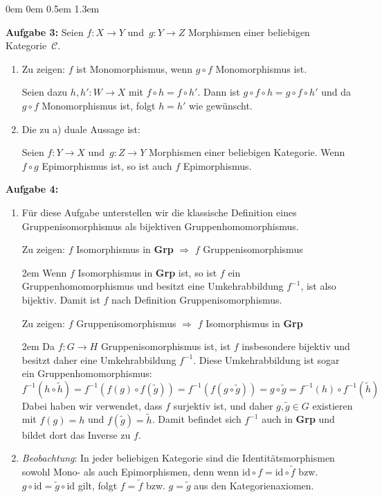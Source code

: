\documentclass[a4paper,ngerman]{scrartcl}
\theoremstyle{definition}
\theoremstyle{plain}
\theoremstyle{remark}
\newcommand{\C}{\mathcal{C}}
\newcommand{\id}{\mathrm{id}}
\begin{document}
\begin{list}{}{0em \leftmargin0em \itemindent0.5em \itemsep 1.3em}
\item[\textbf{Aufgabe 3:}]
Seien $f:X \to Y$ und~$g:Y \to Z$ Morphismen einer beliebigen Kategorie~$\C$.
\begin{enumerate}
\item Zu zeigen: $f$ ist Monomorphismus, wenn $g \circ f$ Monomorphismus ist.

  Seien dazu $h, h' : W \to X$ mit $f \circ h = f \circ h'$. Dann ist 
  $g \circ f \circ h = g \circ f \circ h'$ und da $g \circ f$ Monomorphismus ist,
  folgt $h = h'$ wie gewünscht.
\item Die zu a) duale Aussage ist:

  Seien $f:Y \to X$ und~$g:Z \to Y$ Morphismen einer beliebigen Kategorie. Wenn $f \circ g$ Epimorphismus ist, so ist auch $f$ Epimorphismus.
\end{enumerate}


\item[\textbf{Aufgabe 4:}]\mbox{}
\begin{enumerate}
\item Für diese Aufgabe unterstellen wir die klassische Definition eines
Gruppenisomorphismus als bijektiven Gruppenhomomorphismus.

Zu zeigen: $f$ Isomorphismus in \textbf{Grp} $\Rightarrow$ $f$ Gruppenisomorphismus

    \begin{addmargin}{2em}
      Wenn $f$ Isomorphismus in \textbf{Grp} ist, so ist $f$ ein Gruppenhomomorphismus und besitzt eine Umkehrabbildung $f^{-1}$, ist also bijektiv. Damit ist $f$ nach Definition Gruppenisomorphismus.
    \end{addmargin}

Zu zeigen: $f$ Gruppenisomorphismus $\Rightarrow$ $f$ Isomorphismus in \textbf{Grp}

    \begin{addmargin}{2em}
      Da $f : G \to H$ Gruppenisomorphismus ist, ist $f$ insbesondere bijektiv und besitzt daher eine Umkehrabbildung $f^{-1}$.
      Diese Umkehrabbildung ist sogar ein Gruppenhomomorphismus:
      $$f^{-1}(h \circ \widetilde{h}) = f^{-1}(f(g) \circ f(\widetilde{g})) = f^{-1}(f(g \circ \widetilde{g})) = g \circ \widetilde{g} = f^{-1}(h) \circ f^{-1}(\widetilde{h})$$
      Dabei haben wir verwendet, dass $f$ surjektiv ist, und daher $g, \widetilde{g} \in G$ existieren mit
      $f(g) = h$ und $f(\widetilde{g}) = \widetilde{h}$. Damit befindet sich $f^{-1}$ auch in \textbf{Grp} und bildet dort das Inverse zu $f$.
    \end{addmargin}
\item
  \emph{Beobachtung}: In jeder beliebigen Kategorie sind die Identitätsmorphismen sowohl Mono- als auch Epimorphismen, denn wenn $\id \circ f = \id \circ \widetilde{f}$ bzw. $g \circ \id = \widetilde{g} \circ \id$ gilt, folgt $f = \widetilde{f}$ bzw. $g = \widetilde{g}$ aus den Kategorienaxiomen.


\end{enumerate}
\end{list}
\end{document}

